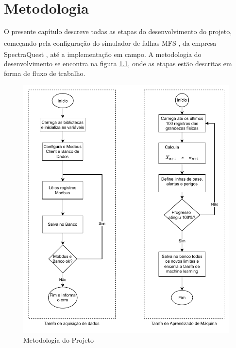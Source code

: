 
\chapter{Metodologia}

O presente capítulo descreve todas as etapas do desenvolvimento do projeto, começando pela configuração do simulador de falhas MFS 
\textsuperscript \textregistered, da empresa SpectraQuest \textsuperscript \textregistered, até a implementação em campo. A metodologia do
desenvolvimento se encontra na figura \ref{fig:metodologia}, onde as etapas estão descritas em forma de fluxo de trabalho.

\begin{figure}[H]
    \caption{Metodologia do Projeto}
    \begin{center}
        \includegraphics[scale=1.1, page=3]{metodologia/img/software.pdf}
    \end{center}
    \label{fig:metodologia}
\end{figure}

